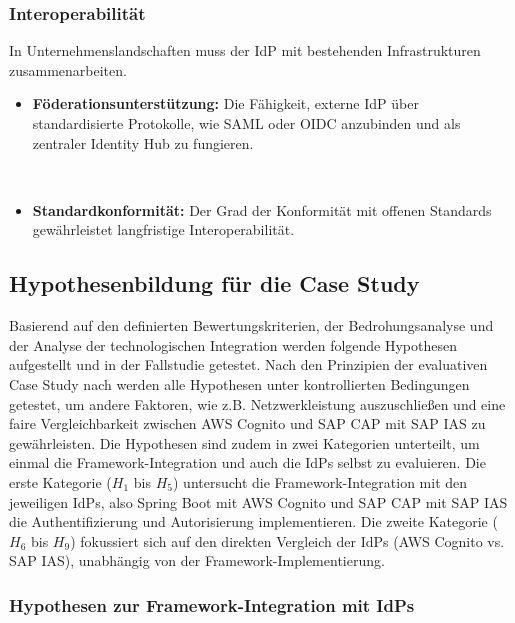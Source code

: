 \subsubsection{Interoperabilität}

In Unternehmenslandschaften muss der \ac{IdP} mit bestehenden Infrastrukturen zusammenarbeiten.

\begin{itemize}
    \item \textbf{Föderationsunterstützung:} Die Fähigkeit, externe \ac{IdP} über standardisierte Protokolle, wie \ac{SAML} oder \ac{OIDC} anzubinden und als zentraler Identity Hub zu fungieren.

    \item \textbf{Standardkonformität:} Der Grad der Konformität mit offenen Standards gewährleistet langfristige Interoperabilität.
\end{itemize}

\subsection{Hypothesenbildung für die Case Study}
\label{sec:hypothesen}

Basierend auf den definierten Bewertungskriterien, der Bedrohungsanalyse und der Analyse der technologischen Integration werden folgende Hypothesen aufgestellt und in der Fallstudie getestet. Nach den Prinzipien der evaluativen Case Study nach \citep{Kitchenham1995} werden alle Hypothesen unter kontrollierten Bedingungen getestet, um andere Faktoren, wie z.B. Netzwerkleistung auszuschließen und eine faire Vergleichbarkeit zwischen \ac{AWS} Cognito und \ac{SAP CAP} mit \ac{SAP IAS} zu gewährleisten.
\newline
Die Hypothesen sind zudem in zwei Kategorien unterteilt, um einmal die Framework-Integration und auch die \ac{IdP}s selbst zu evaluieren. Die erste Kategorie ($H_1$ bis $H_5$) untersucht die Framework-Integration mit den jeweiligen \ac{IdP}s, also Spring Boot mit \ac{AWS} Cognito und \ac{SAP CAP} mit \ac{SAP IAS} die Authentifizierung und Autorisierung implementieren. Die zweite Kategorie ($H_6$ bis $H_9$) fokussiert sich auf den direkten Vergleich der \ac{IdP}s (\ac{AWS} Cognito vs. \ac{SAP IAS}), unabhängig von der Framework-Implementierung.

\subsubsection{Hypothesen zur Framework-Integration mit IdPs}

